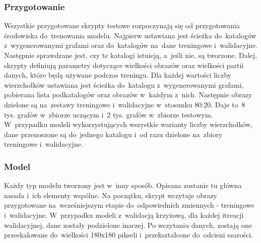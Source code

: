 \subsubsection{Przygotowanie}
Wszystkie przygotowane skrypty testowe rozpoczynają się od przygotowania środowiska do~trenowania modelu.
Najpierw ustawiana jest ścieżka do~katalogów z~wygenerowanymi grafami oraz do~katalogów na~dane treningowe i~walidacyjne.
Następnie sprawdzane jest, czy te katalogi istnieją, a~jeśli nie, są tworzone.
Dalej, skrypty definiują parametry dotyczące wielkości obrazów oraz wielkości partii danych, które będą używane podczas treningu.
Dla każdej wartości liczby wierzchołków ustawiana jest ścieżka do~katalogu z~wygenerowanymi grafami,
pobierana lista podkatalogów oraz obrazów w~każdym z~nich.
Następnie obrazy dzielone są na~zestawy treningowe i~walidacyjne w~stosunku 80:20.
Daje to~8 tys. grafów w~zbiorze uczącym i~2 tys. grafów w~zbiorze testowym.
W~przypadku modeli wykorzystujących wszystkie warianty liczby wierzchołków, dane przenoszone są do~jednego katalogu
i~od razu dzielone na~zbiory treningowe i~walidacyjne.

\subsubsection{Model}
Każdy typ modelu tworzony jest w~inny sposób. Opisana zostanie tu główna zasada i~ich elementy wspólne.
Na początku, skrypt wczytuje obrazy przygotowane na~wcześniejszym etapie do~odpowiednich zmiennych - treningowe i~walidacyjne.
W~przypadku modeli z~walidacją krzyżową, dla każdej itreacji walidacyjnej, dane zostały podzielone inaczej.
Po wczytaniu danych, zostają one przeskalowane do~wielkości 180x180 pikseli i~przekształcone do~odcieni szarości.

\clearpage

